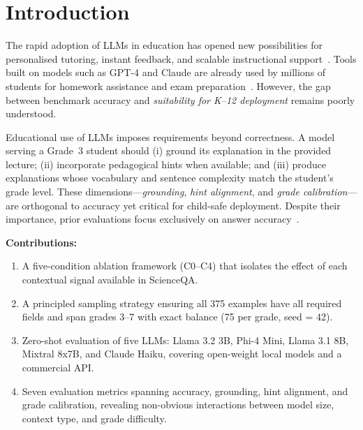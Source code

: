 \documentclass[journal]{IEEEtran}
\begin{document}
\section{Introduction}
\label{sec:introduction}

The rapid adoption of LLMs in education has opened new possibilities for
personalised tutoring, instant feedback, and scalable instructional
support~\cite{kasneci2023chatgpt,holmes2019artificial}. Tools built on
models such as GPT-4 and Claude are already used by millions of students
for homework assistance and exam preparation~\cite{wardat2023chatgpt}.
However, the gap between benchmark accuracy and \emph{suitability for
K--12 deployment} remains poorly understood.

Educational use of LLMs imposes requirements beyond correctness. A model
serving a Grade~3 student should (i) ground its explanation in the provided
lecture; (ii) incorporate pedagogical hints when available; and (iii) produce
explanations whose vocabulary and sentence complexity match the student's
grade level. These dimensions---\emph{grounding}, \emph{hint alignment}, and
\emph{grade calibration}---are orthogonal to accuracy yet critical for
child-safe deployment. Despite their importance, prior evaluations focus
exclusively on answer accuracy~\cite{lu2022scienceqa}.

\textbf{Contributions:}
\begin{enumerate}[leftmargin=*, label=(\roman*)]
  \item A five-condition ablation framework (C0--C4) that isolates the
        effect of each contextual signal available in ScienceQA.
  \item A principled sampling strategy ensuring all 375 examples have all
        required fields and span grades 3--7 with exact balance (75 per
        grade, seed = 42).
  \item Zero-shot evaluation of five LLMs: Llama 3.2 3B, Phi-4 Mini,
        Llama 3.1 8B, Mixtral 8x7B, and Claude Haiku, covering open-weight
        local models and a commercial API.
  \item Seven evaluation metrics spanning accuracy, grounding, hint
        alignment, and grade calibration, revealing non-obvious interactions
        between model size, context type, and grade difficulty.
\end{enumerate}

\end{document}
